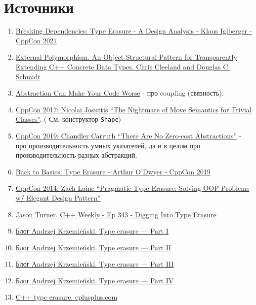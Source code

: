 \documentclass[14pt,a4paper]{article}
\providecommand{\tightlist}{%
	\setlength{\itemsep}{0pt}\setlength{\parskip}{0pt}}
\begin{document}
\hypertarget{ux438ux441ux442ux43eux447ux43dux438ux43aux438}{%
\section{Источники}\label{ux438ux441ux442ux43eux447ux43dux438ux43aux438}}

\begin{enumerate}
\def\labelenumi{\arabic{enumi}.}
\tightlist
\item
  \href{https://youtu.be/4eeESJQk-mw}{Breaking Dependencies: Type
  Erasure - A Design Analysis - Klaus Iglberger - CppCon 2021}
\item
  \href{https://www.dre.vanderbilt.edu/~schmidt/PDF/C++-EP.pdf}{External
  Polymorphism. An Object Structural Pattern for Transparently Extending
  C++ Concrete Data Types. Chris Cleeland and Douglas C. Schmidt}
\item
  \href{https://youtu.be/rQlMtztiAoA}{Abstraction Can Make Your Code
  Worse} - про coupling (связность).
\item
  \href{https://youtu.be/PNRju6_yn3o}{CppCon 2017: Nicolai Josuttis
  ``The Nightmare of Move Semantics for Trivial Classes''}. ( См.
  конструктор \texttt{Shape})
\item
  \href{https://youtu.be/rHIkrotSwcc}{CppCon 2019: Chandler Carruth
  ``There Are No Zero-cost Abstractions''} - про производительность
  умных указателей, да и в целом про производительность разных
  абстракций.
\item
  \href{https://youtu.be/tbUCHifyT24}{Back to Basics: Type Erasure -
  Arthur O'Dwyer - CppCon 2019}
\item
  \href{https://youtu.be/0I0FD3N5cgM}{CppCon 2014: Zach Laine
  ``Pragmatic Type Erasure: Solving OOP Problems w/ Elegant Design
  Pattern''}
\item
  \href{https://youtu.be/iMzEUdacznQ}{Jason Turner. C++ Weekly - Ep 343
  - Digging Into Type Erasure}
\item
  \href{https://akrzemi1.wordpress.com/2013/11/18/type-erasure-part-i/}{Блог
  Andrzej Krzemieński. Type erasure --- Part I}
\item
  \href{https://akrzemi1.wordpress.com/2013/12/06/type-erasure-part-ii/}{Блог
  Andrzej Krzemieński. Type erasure --- Part II}
\item
  \href{https://akrzemi1.wordpress.com/2013/12/11/type-erasure-part-iii/}{Блог
  Andrzej Krzemieński. Type erasure --- Part III}
\item
  \href{https://akrzemi1.wordpress.com/2014/01/13/type-erasure-part-iv/}{Блог
  Andrzej Krzemieński. Type erasure --- Part IV}
\item
  \href{https://cplusplus.com/articles/oz18T05o/}{C++ type erasure.
  cplusplus.com}
\end{enumerate}
\end{document}
